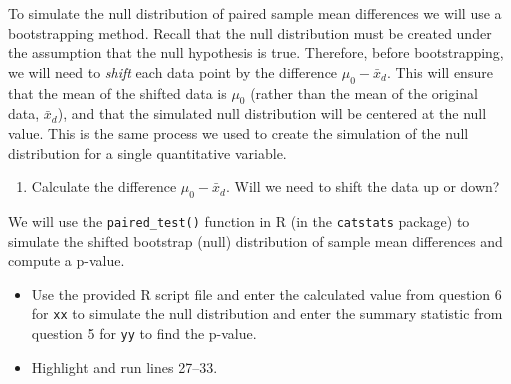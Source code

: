 \documentclass[
]{report}
\newenvironment{Shaded}{\begin{snugshade}}{\end{snugshade}}
\newcommand{\AttributeTok}[1]{\textcolor[rgb]{0.13,0.29,0.53}{#1}}
\newcommand{\CommentTok}[1]{\textcolor[rgb]{0.56,0.35,0.01}{\textit{#1}}}
\newcommand{\DecValTok}[1]{\textcolor[rgb]{0.00,0.00,0.81}{#1}}
\newcommand{\FunctionTok}[1]{\textcolor[rgb]{0.13,0.29,0.53}{\textbf{#1}}}
\newcommand{\NormalTok}[1]{#1}
\newcommand{\SpecialCharTok}[1]{\textcolor[rgb]{0.81,0.36,0.00}{\textbf{#1}}}
\newcommand{\StringTok}[1]{\textcolor[rgb]{0.31,0.60,0.02}{#1}}
\providecommand{\tightlist}{%
  \setlength{\itemsep}{0pt}\setlength{\parskip}{0pt}}
\begin{document}
To simulate the null distribution of paired sample mean differences we will use a bootstrapping method. Recall that the null distribution must be created under the assumption that the null hypothesis is true. Therefore, before bootstrapping, we will need to \emph{shift} each data point by the difference \(\mu_0 - \bar{x}_d\). This will ensure that the mean of the shifted data is \(\mu_0\) (rather than the mean of the original data, \(\bar{x}_d\)), and that the simulated null distribution will be centered at the null value. This is the same process we used to create the simulation of the null distribution for a single quantitative variable.

\begin{enumerate}
\def\labelenumi{\arabic{enumi}.}
\setcounter{enumi}{5}
\tightlist
\item
  Calculate the difference \(\mu_0 - \bar{x}_d\). Will we need to shift the data up or down?
\end{enumerate}

\vspace{.7in}
\newpage

We will use the \texttt{paired\_test()} function in R (in the \texttt{catstats} package) to simulate the shifted bootstrap (null) distribution of sample mean differences and compute a p-value.

\begin{itemize}
\item
  Use the provided R script file and enter the calculated value from question 6 for \texttt{xx} to simulate the null distribution and enter the summary statistic from question 5 for \texttt{yy} to find the p-value.
\item
  Highlight and run lines 27--33.
\end{itemize}

\begin{Shaded}
\end{Shaded}
\end{document}
